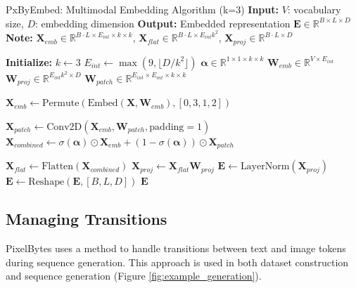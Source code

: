 \documentclass[10pt,a4paper]{article}
\begin{document}
\begin{algorithm}[h]
\caption{PxByEmbed: Multimodal Embedding Algorithm (k=3)
\newline
\textbf{Input:} $V$: vocabulary size, $D$: embedding dimension
\newline
\textbf{Output:} Embedded representation $\mathbf{E} \in \mathbb{R}^{B \times L \times D}$
\newline
\textbf{Note:} $\mathbf{X}_{emb} \in \mathbb{R}^{B \cdot L \times E_{int} \times k \times k}$, 
$\mathbf{X}_{flat} \in \mathbb{R}^{B \cdot L \times E_{int}k^2}$, 
$\mathbf{X}_{proj} \in \mathbb{R}^{B \cdot L \times D}$
}
\begin{algorithmic}[0]
\State \textbf{Initialize:}
\State $k \gets 3$
\State $E_{int} \gets \max(9, \lfloor D / k^2 \rfloor)$
\State $\mathbf{\alpha} \in \mathbb{R}^{1 \times 1 \times k \times k}$ 
\State $\mathbf{W}_{emb} \in \mathbb{R}^{V \times E_{int}}$ 
\State $\mathbf{W}_{proj} \in \mathbb{R}^{E_{int}k^2 \times D}$ 
\State $\mathbf{W}_{patch} \in \mathbb{R}^{E_{int} \times E_{int} \times k \times k}$ 

    \State $\mathbf{X}_{emb} \gets \text{Permute}(\text{Embed}(\mathbf{X}, \mathbf{W}_{emb}), [0, 3, 1, 2])$ 
    
    \State $\mathbf{X}_{patch} \gets \text{Conv2D}(\mathbf{X}_{emb}, \mathbf{W}_{patch}, \text{padding}=1)$
    \State $\mathbf{X}_{combined} \gets \sigma(\mathbf{\alpha}) \odot \mathbf{X}_{emb} + (1 - \sigma(\mathbf{\alpha})) \odot \mathbf{X}_{patch}$
    
    \State $\mathbf{X}_{flat} \gets \text{Flatten}(\mathbf{X}_{combined})$ 
    \State $\mathbf{X}_{proj} \gets \mathbf{X}_{flat}\mathbf{W}_{proj}$ 
    \State $\mathbf{E} \gets \text{LayerNorm}(\mathbf{X}_{proj})$
    \State $\mathbf{E} \gets \text{Reshape}(\mathbf{E}, [B, L, D])$
    \State \Return $\mathbf{E}$
\EndFunction
\end{algorithmic}
\end{algorithm}

\subsection{Managing Transitions}

PixelBytes uses a method to handle transitions between text and image tokens during sequence generation. This approach is used in both dataset construction and sequence generation (Figure \ref{fig:example_generation}).
\end{document}
